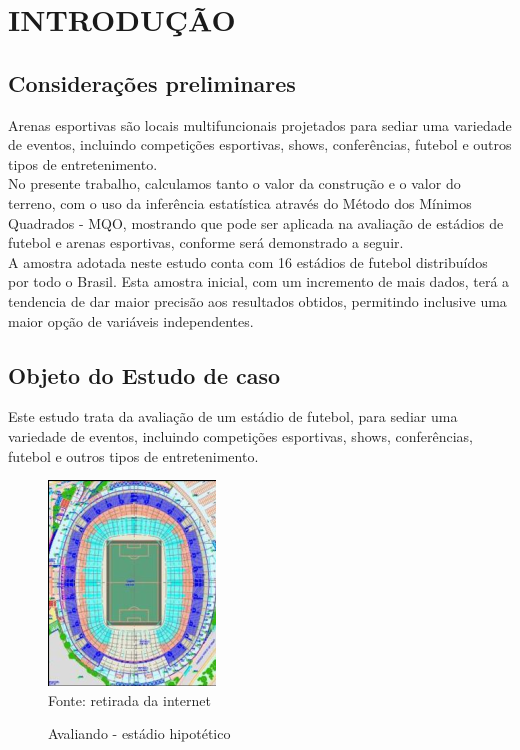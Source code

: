 
\section{INTRODUÇÃO }
\subsection{ Considerações preliminares }
%
\hspace*{1.25 cm}  Arenas esportivas são locais multifuncionais projetados para sediar uma variedade de eventos, incluindo competições esportivas, shows, conferências, futebol e outros tipos de entretenimento.\\ 
%
\hspace*{1.25 cm} No presente trabalho, calculamos tanto o valor da construção e o valor do terreno, com o uso da inferência estatística através do Método dos Mínimos Quadrados - MQO, mostrando que pode ser aplicada na avaliação de estádios de futebol e arenas esportivas, conforme será demonstrado a seguir.\\ 
%
\hspace*{1.25 cm} A amostra adotada neste estudo conta com 16 estádios de futebol distribuídos por todo o Brasil. Esta amostra inicial, com um incremento de mais dados, terá a tendencia de dar maior precisão aos resultados obtidos, permitindo inclusive uma maior opção de variáveis independentes.

\subsection{ Objeto do Estudo de caso }


Este estudo trata da avaliação de um estádio de futebol, para sediar uma variedade de eventos, incluindo competições esportivas, shows, conferências, futebol e outros tipos de entretenimento.
\begin{figure}[H]
	\centering  \small 	\caption{Avaliando - estádio hipotético}
	\includegraphics[width=0.347\linewidth]{figura/screenshot001}
	\label{fig:INDICES3}\\{ Fonte:  retirada da internet}
\end{figure}
